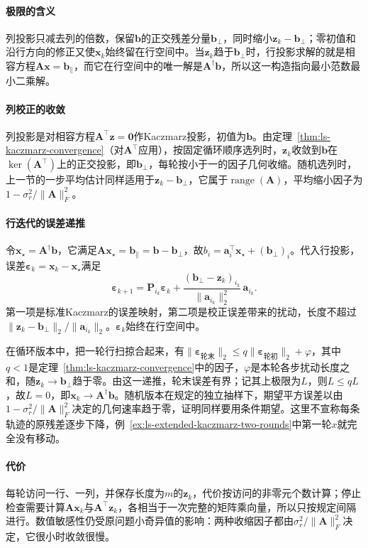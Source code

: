 \paragraph{极限的含义}
列投影只减去列的倍数，保留$\bm b$的正交残差分量$\bm b_\perp$，同时缩小$\bm z_k-\bm b_\perp$；零初值和沿行方向的修正又使$\bm x_k$始终留在行空间中。当$\bm z_k$趋于$\bm b_\perp$时，行投影求解的就是相容方程$\bm A\bm x=\bm b_\parallel$，而它在行空间中的唯一解是$\bm A^\dagger\bm b$，所以这一构造指向最小范数最小二乘解。

\paragraph{列校正的收敛}
列投影是对相容方程$\bm A^\top\bm z=\bm 0$作Kaczmarz投影，初值为$\bm b$。由定理~\ref{thm:ls-kaczmarz-convergence}（对$\bm A^\top$应用），按固定循环顺序选列时，$\bm z_k$收敛到$\bm b$在$\ker(\bm A^\top)$上的正交投影，即$\bm b_\perp$，每轮按小于一的因子几何收缩。随机选列时，上一节的一步平均估计同样适用于$\bm z_k-\bm b_\perp$，它属于$\operatorname{range}(\bm A)$，平均缩小因子为$1-\sigma_r^2/\lVert\bm A\rVert_F^2$。

\paragraph{行迭代的误差递推}
令$\bm x_\star=\bm A^\dagger\bm b$，它满足$\bm A\bm x_\star=\bm b_\parallel=\bm b-\bm b_\perp$，故$b_i=\bm a_i^\top\bm x_\star+(\bm b_\perp)_i$。代入行投影，误差$\bm\varepsilon_k=\bm x_k-\bm x_\star$满足
\[
 \bm\varepsilon_{k+1}=\bm P_{i_k}\bm\varepsilon_k+\frac{(\bm b_\perp-\bm z_k)_{i_k}}{\lVert\bm a_{i_k}\rVert_2^2}\,\bm a_{i_k}.
\]
第一项是标准Kaczmarz的误差映射，第二项是校正误差带来的扰动，长度不超过$\lVert\bm z_k-\bm b_\perp\rVert_2/\lVert\bm a_{i_k}\rVert_2$。$\bm\varepsilon_k$始终在行空间中。

在循环版本中，把一轮行扫掠合起来，有$\lVert\bm\varepsilon_{\text{轮末}}\rVert_2\leq q\lVert\bm\varepsilon_{\text{轮初}}\rVert_2+\varphi$，其中$q<1$是定理~\ref{thm:ls-kaczmarz-convergence}中的因子，$\varphi$是本轮各步扰动长度之和，随$\bm z_k\to\bm b_\perp$趋于零。由这一递推，轮末误差有界；记其上极限为$L$，则$L\leq qL$，故$L=0$，即$\bm x_k\to\bm A^\dagger\bm b$。随机版本在规定的独立抽样下，期望平方误差以由$1-\sigma_r^2/\lVert\bm A\rVert_F^2$决定的几何速率趋于零，证明同样要用条件期望。这里不宣称每条轨迹的原残差逐步下降，例~\ref{ex:ls-extended-kaczmarz-two-rounds}中第一轮$x$就完全没有移动。

\paragraph{代价}
每轮访问一行、一列，并保存长度为$m$的$\bm z_k$，代价按访问的非零元个数计算；停止检查需要计算$\bm A\bm x_k$与$\bm A^\top\bm z_k$，各相当于一次完整的矩阵乘向量，所以只按规定间隔进行。数值敏感性仍受原问题小奇异值的影响：两种收缩因子都由$\sigma_r^2/\lVert\bm A\rVert_F^2$决定，它很小时收敛很慢。

